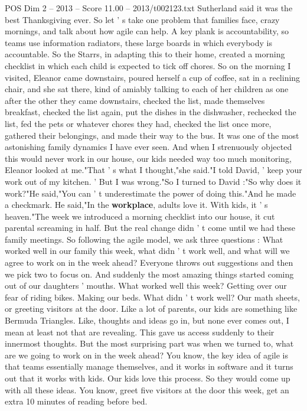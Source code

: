 \begin{textsample}{POS Dim 2 – 2013 – Score 11.00 – 2013/t002123.txt}
Sutherland said it was the best Thanksgiving ever.
So let ' s take one problem that families face, crazy mornings, and talk about how agile can help.
A key plank is accountability, so teams use information radiators, these large boards in which everybody is accountable.
So the Starrs, in adapting this to their home, created a morning checklist in which each child is expected to tick off chores.
So on the morning I visited, Eleanor came downstairs, poured herself a cup of coffee, sat in a reclining chair, and she sat there, kind of amiably talking to each of her children as one after the other they came downstairs, checked the list, made themselves breakfast, checked the list again, put the dishes in the dishwasher, rechecked the list, fed the pets or whatever chores they had, checked the list once more, gathered their belongings, and made their way to the bus.
It was one of the most astonishing family dynamics I have ever seen.
And when I strenuously objected this would never work in our house, our kids needed way too much monitoring, Eleanor looked at me."That ' s what I thought,"she said."I told David, ' keep your work out of my kitchen. ' But I was wrong."So I turned to David :"So why does it work?"He said,"You can ' t underestimate the power of doing this."And he made a checkmark.
He said,"In the \textbf{workplace}, adults love it.
With kids, it ' s heaven."The week we introduced a morning checklist into our house, it cut parental screaming in half.
But the real change didn ' t come until we had these family meetings.
So following the agile model, we ask three questions : What worked well in our family this week, what didn ' t work well, and what will we agree to work on in the week ahead?
Everyone throws out suggestions and then we pick two to focus on.
And suddenly the most amazing things started coming out of our daughters ' mouths.
What worked well this week?
Getting over our fear of riding bikes.
Making our beds.
What didn ' t work well?
Our math sheets, or greeting visitors at the door.
Like a lot of parents, our kids are something like Bermuda Triangles.
Like, thoughts and ideas go in, but none ever comes out, I mean at least not that are revealing.
This gave us access suddenly to their innermost thoughts.
But the most surprising part was when we turned to, what are we going to work on in the week ahead?
You know, the key idea of agile is that teams essentially manage themselves, and it works in software and it turns out that it works with kids.
Our kids love this process.
So they would come up with all these ideas.
You know, greet five visitors at the door this week, get an extra 10 minutes of reading before bed.

\end{textsample}
